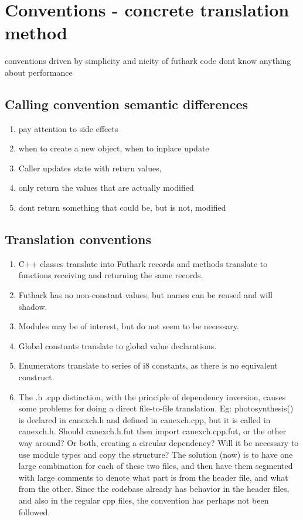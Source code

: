 \section{Conventions - concrete translation method}
conventions driven by simplicity and nicity of futhark code
dont know anything about performance

\subsection*{Calling convention semantic differences}
\begin{enumerate}
  \item pay attention to side effects
  \item when to create a new object, when to inplace update
  \item Caller updates state with return values,
  \item only return the values that are actually modified
  \item dont return something that could be, but is not, modified
\end{enumerate}

\subsection*{Translation conventions}\cite{smallarraysbad} \cite{futhark}
\begin{enumerate}
  \item C++ classes translate into Futhark records and methods translate to functions receiving and returning the same records.
  \item Futhark has no non-constant values, but names can be reused and will shadow.
  \item Modules may be of interest, but do not seem to be necessary.
  \item Global constants translate to global value declarations.
  \item Enumerators translate to series of i8 constants, as there is no equivalent construct.
  \item The .h .cpp distinction, with the principle of dependency inversion, causes some problems for doing a direct file-to-file translation. Eg: photosynthesis() is declared in canexch.h and defined in canexch.cpp, but it is called in canexch.h. Should canexch.h.fut then import canexch.cpp.fut, or the other way around? Or both, creating a circular dependency? Will it be necessary to use module types and copy the structure? The solution (now) is to have one large combination for each of these two files, and then have them segmented with large comments to denote what part is from the header file, and what from the other. Since the codebase already has behavior in the header files, and also in the regular cpp files, the convention has perhaps not been followed.
\end{enumerate}


